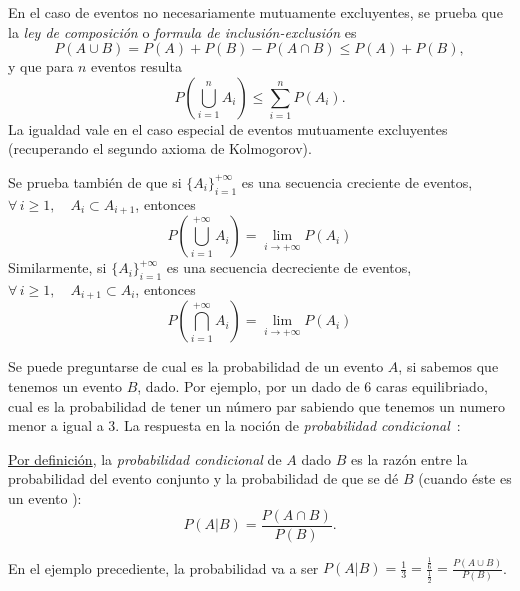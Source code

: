 En el caso de eventos no necesariamente mutuamente excluyentes, se prueba que la
{\it ley de composici\'on} o {\it formula de inclusi\'on-exclusi\'on} es
%
\[
P(A \cup B) = P(A) + P(B) - P(A \cap B) \leq P(A) + P(B), 
\]
%
y que para $n$ eventos resulta
%
\[
P\left( \bigcup_{i=1}^n A_i \right) \leq \sum_{i=1}^n P\left( A_i \right).
\]
%
La  igualdad  vale  en  el  caso  especial  de  eventos  mutuamente  excluyentes
(recuperando el segundo axioma de Kolmogorov).

Se  prueba tambi\'en  de que  si $\{  A_i \}_{i=1}^{+\infty}$  es  una secuencia
creciente  de eventos,  \ie $\forall  \, i  \ge 1,  \quad A_i  \subset A_{i+1}$,
entonces
%
\[
P\left( \bigcup_{i=1}^{+\infty} A_i \right) = \lim_{i \to +\infty} P(A_i)
\]
%
Similarmente,  si $\{ A_i  \}_{i=1}^{+\infty}$ es  una secuencia  decreciente de
eventos, \ie $\forall \, i \ge 1, \quad A_{i+1} \subset A_i$, entonces
%
\[
P\left( \bigcap_{i=1}^{+\infty} A_i \right) = \lim_{i \to +\infty} P(A_i)
\]

Se puede preguntarse de cual es la probabilidad de un evento $A$, si sabemos que
tenemos un evento $B$, dado.  Por  ejemplo, por un dado de 6 caras equilibriado,
cual es la probabilidad de tener  un n\'umero par sabiendo que tenemos un numero
menor  a  igual a 3.  La respuesta  en la noci\'on
de  {\it probabilidad condicional}~\cite{Hau01,  Jef48, Jef73,  Bre88, ManWol95,
  JacPro03, ShaVov06}:
%
\begin{definicion}\label{def:MP:ProbaCondicional}
  \underline{Por definici\'on},  la {\it  probabilidad condicional} de  $A$ dado
  $B$ es la raz\'on entre la  probabilidad del evento conjunto y la probabilidad
  de  que se  d\'e $B$  (cuando \'este  es un  evento ):
  \[
  P(A|B) = \frac{P(A \cap B)}{P(B)}.
  \]
\end{definicion}
%
En  el  ejemplo precediente,  la  probabilidad  va a  ser  $P(A|B)  = \frac13  =
\frac{\frac16}{\frac12}  = \frac{P(A  \cup B)}{P(B)}$. 

